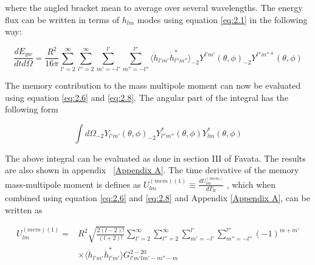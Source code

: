 \documentclass[twocolumn,showpacs,aps,prd,nobibnotes,floatfix]{revtex4-1}
\begin{document}
where the angled bracket mean to average over several wavelengths. The energy flux can be written in terms of $h_{lm}$ modes using equation \ref{eq:2.1} in the following way:
\begin{widetext}
\begin{equation}\label{eq:2.8}
		\frac{dE_{gw}}{dtd\Omega}=\frac{R^2}{16\pi}\sum_{l'=2}^{\infty}\sum_{l''=2}^{\infty}\sum_{m'=-l'}^{l'}\sum_{m''=-l''}^{l''}\langle\dot{h}_{l'm'}\dot{h}^*_{l''m''}\rangle _{-2}Y^{l'm'}(\theta,\phi)_{-2}Y^{l''m''*}(\theta, \phi)
\end{equation}
\end{widetext}

The memory contribution to the mass multipole moment can now be evaluated using equation \ref{eq:2.6} and \ref{eq:2.8}. The angular part of the integral has the following form

\begin{equation}\label{eq:2.9}
	\int d\Omega _{-2}Y_{l'm'}(\theta,\phi)_{-2}Y_{l''m''}^{*}(\theta, \phi)Y_{lm}^{*}(\theta, \phi)
\end{equation}

The above integral can be evaluated as done in section III of  Favata\cite{Favata2009}. The results are also shown in appendix ~\ref{Appendix A}. The time derivative of the memory mass-multipole moment is defines as $U^{(mem)(1)}_{lm}\equiv\frac{dU^{(mem)}_{lm}}{dT_R}$ \cite{Favata2009}, which when combined using equation \ref{eq:2.6} and \ref{eq:2.8} and Appendix \ref{Appendix A}, can be written as

\begin{align}\label{eq:2.10}
	U_{lm}^{(mem)(1)}=&R^{2}\sqrt{\frac{2(l-2)!}{(l+2)!}}\sum_{l'=2}^{\infty}\sum_{l''=2}^{\infty}\sum_{m'=-l'}^{l'}\sum_{m''=-l''}^{l''}(-1)^{m+m'}\nonumber\\
	&\times\Bigg\langle \dot{h}_{l'm'}\dot{h}_{l'm'}^{*}\Bigg\rangle G^{2-20}_{l'm'lm'-m''-m}
\end{align}
 
\end{document}
